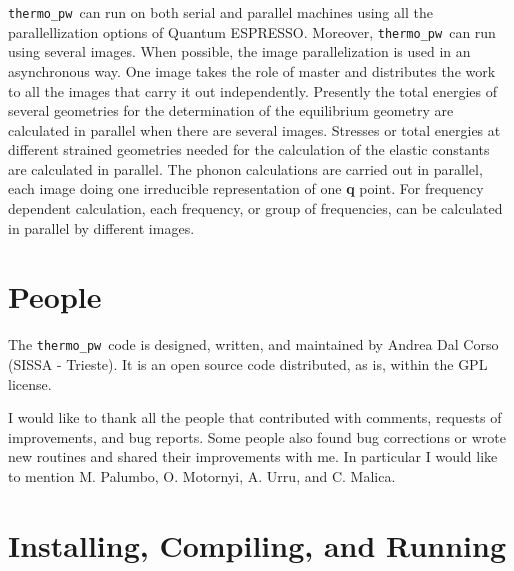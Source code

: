 \documentclass[12pt,a4paper]{article}
\def\qe{{\sc Quantum ESPRESSO}}
\def\thermo{\texttt{thermo\_pw}}
\begin{document}
\thermo\ can run on both serial and parallel machines using all 
the parallellization options of \qe. Moreover, \thermo\ can run using 
several images.
When possible, the image parallelization is used in an asynchronous way.
One image takes the role of master and distributes the work 
to all the images that carry it out independently. Presently 
the total energies of several geometries for the determination of the 
equilibrium geometry are calculated in parallel when
there are several images. Stresses or total energies at different strained 
geometries needed for the calculation of the elastic constants are 
calculated in parallel. 
The phonon calculations are carried out in parallel, each image doing one 
irreducible representation of one {\bf q} point. For frequency dependent 
calculation,
each frequency, or group of frequencies, can be calculated in parallel
by different images.

\newpage
\section{\color{coral}People}
The \thermo\ code is designed, written, and maintained by Andrea Dal Corso 
(SISSA - Trieste). It is an open source code distributed, as is, within the GPL
license.  

I would like to thank all the people that contributed with comments, requests
of improvements, and bug reports. Some people also found bug corrections or
wrote new routines and shared their improvements with me. In particular I would 
like to mention M. Palumbo, O. Motornyi, A. Urru, and C. Malica.

\newpage
\section{\color{coral}Installing, Compiling, and Running}
\end{document}
